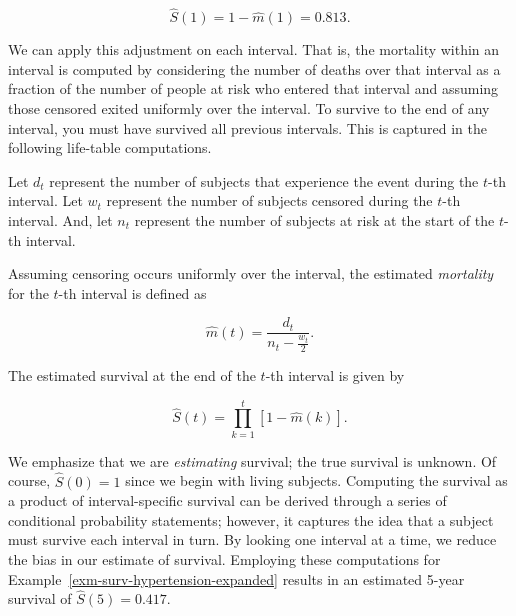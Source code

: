 \documentclass[
  letterpaper,
  DIV=11,
  numbers=noendperiod]{scrreprt}
\theoremstyle{definition}
\theoremstyle{definition}
\theoremstyle{remark}
\begin{document}
\[\widehat{S}(1) = 1 - \widehat{m}(1) = 0.813.\]

We can apply this adjustment on each interval. That is, the mortality
within an interval is computed by considering the number of deaths over
that interval as a fraction of the number of people at risk who entered
that interval and assuming those censored exited uniformly over the
interval. To survive to the end of any interval, you must have survived
all previous intervals. This is captured in the following life-table
computations.

\begin{tcolorbox}[enhanced jigsaw, left=2mm, toprule=.15mm, arc=.35mm, breakable, opacitybacktitle=0.6, opacityback=0, rightrule=.15mm, colbacktitle=quarto-callout-note-color!10!white, coltitle=black, leftrule=.75mm, toptitle=1mm, colframe=quarto-callout-note-color-frame, titlerule=0mm, title=\textcolor{quarto-callout-note-color}{\faInfo}\hspace{0.5em}{Life Table Computations}, bottomrule=.15mm, colback=white, bottomtitle=1mm]

Let \(d_t\) represent the number of subjects that experience the event
during the \(t\)-th interval. Let \(w_t\) represent the number of
subjects censored during the \(t\)-th interval. And, let \(n_{t}\)
represent the number of subjects at risk at the start of the \(t\)-th
interval.

Assuming censoring occurs uniformly over the interval, the estimated
\emph{mortality} for the \(t\)-th interval is defined as

\[\widehat{m}(t) = \frac{d_t}{n_t - \frac{w_t}{2}}.\]

The estimated survival at the end of the \(t\)-th interval is given by

\[\widehat{S}(t) = \prod_{k=1}^{t} \left[1 - \widehat{m}(k)\right].\]

\end{tcolorbox}

We emphasize that we are \emph{estimating} survival; the true survival
is unknown. Of course, \(\widehat{S}(0) = 1\) since we begin with living
subjects. Computing the survival as a product of interval-specific
survival can be derived through a series of conditional probability
statements; however, it captures the idea that a subject must survive
each interval in turn. By looking one interval at a time, we reduce the
bias in our estimate of survival. Employing these computations for
Example~\ref{exm-surv-hypertension-expanded} results in an estimated
5-year survival of \(\widehat{S}(5) = 0.417.\)
\end{document}
